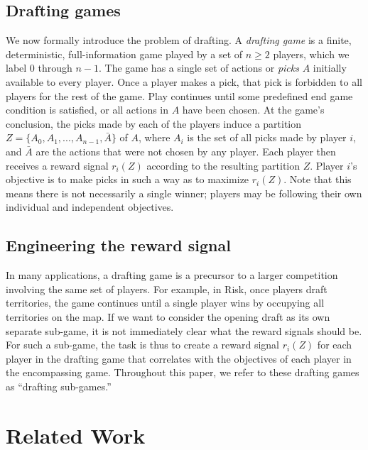 \documentclass[letterpaper]{article}
\numberwithin{equation}{section}
\numberwithin{theorem}{section}
\numberwithin{lemma}{section}
\numberwithin{df}{section}
\begin{document}

\subsection{Drafting games}
\label{subsec:DraftingGames}

We now formally introduce the problem of drafting.  A \emph{drafting game} is a finite, deterministic, full-information game played by a set of $n \geq 2$ players, which we label 0 through $n-1$.  The game has a single set of actions or \emph{picks} $A$ initially available to every player.  Once a player makes a pick, that pick is forbidden to all players for the rest of the game.  Play continues until some predefined end game condition is satisfied, or all actions in $A$ have been chosen.  At the game's conclusion, the picks made by each of the players induce a partition $Z = \{A_0, A_1, ..., A_{n-1}, \bar{A}\}$ of $A$, where $A_i$ is the set of all picks made by player $i$, and $\bar{A}$ are the actions that were not chosen by any player.  Each player then receives a reward signal $r_i(Z)$ according to the resulting partition $Z$.  Player $i$'s objective is to make picks in such a way as to maximize $r_i(Z)$.  Note that this means there is not necessarily a single winner; players may be following their own individual and independent objectives.

\subsection{Engineering the reward signal}

In many applications, a drafting game is a precursor to a larger competition involving the same set of players.  For example, in Risk, once players draft territories, the game continues until a single player wins by occupying all territories on the map.  If we want to consider the opening draft as its own separate sub-game, it is not immediately clear what the reward signals should be.  For such a sub-game, the task is thus to create a reward signal $r_i(Z)$ for each player in the drafting game that correlates with the objectives of each player in the encompassing game.  Throughout this paper, we refer to these drafting games as ``drafting sub-games.''

\section{Related Work}
\end{document}
